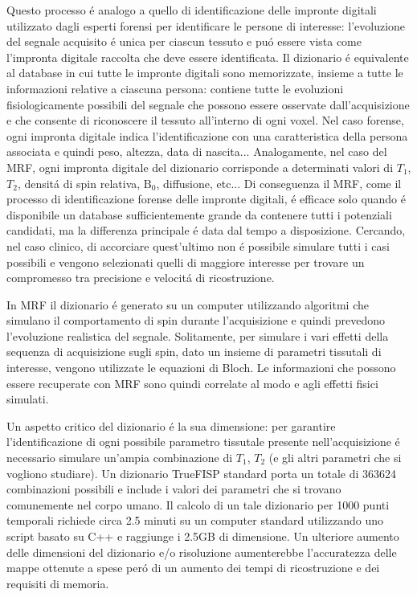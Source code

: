 \documentclass[a4paper,12pt]{report}
\begin{document}
 Questo processo \'e analogo a quello di identificazione delle impronte digitali utilizzato dagli esperti forensi per identificare le persone di interesse: l'evoluzione del segnale acquisito \'e unica per ciascun tessuto e pu\'o essere vista come l'impronta digitale raccolta che deve essere identificata. 
 Il dizionario \'e equivalente al database in cui tutte le impronte digitali sono memorizzate, insieme a tutte le informazioni relative a ciascuna persona: contiene tutte le evoluzioni fisiologicamente possibili del segnale che possono essere osservate dall'acquisizione e che consente di riconoscere il tessuto all'interno di ogni voxel. 
 Nel caso forense, ogni impronta digitale indica l'identificazione con una caratteristica della persona associata e quindi peso, altezza, data di nascita... 
 Analogamente, nel caso del MRF, ogni impronta digitale del dizionario corrisponde a determinati valori di $T_1$, $T_2$, densit\'a di spin relativa, $\mbox{B}_0$, diffusione, etc... 
 Di conseguenza il MRF, come il processo di identificazione forense delle impronte digitali, \'e efficace solo quando \'e disponibile un database sufficientemente grande da contenere tutti i potenziali candidati, ma la differenza principale \'e data dal tempo a disposizione. 
 Cercando, nel caso clinico, di accorciare quest'ultimo non \'e possibile simulare tutti i casi possibili e vengono selezionati quelli di maggiore interesse per trovare un compromesso tra precisione e velocit\'a di ricostruzione. 
 
 In MRF il dizionario \'e generato su un computer utilizzando algoritmi che simulano il comportamento di spin durante l'acquisizione e quindi prevedono l'evoluzione realistica del segnale. 
 Solitamente, per simulare i vari effetti della sequenza di acquisizione sugli spin, dato un insieme di parametri tissutali di interesse, vengono utilizzate le equazioni di Bloch. 
 Le informazioni che possono essere recuperate con MRF sono quindi correlate al modo e agli effetti fisici simulati. 
 
 Un aspetto critico del dizionario \'e la sua dimensione: per garantire l'identificazione di ogni possibile parametro tissutale presente nell'acquisizione \'e necessario simulare un'ampia combinazione di $T_1$, $T_2$ (e gli altri parametri che si vogliono studiare). 
 Un dizionario TrueFISP standard porta un totale di 363624 combinazioni possibili e include i valori dei parametri che si trovano comunemente nel corpo umano. 
 Il calcolo di un tale dizionario per 1000 punti temporali richiede circa 2.5 minuti su un computer standard utilizzando uno script basato su C++ e raggiunge i 2.5GB di dimensione. 
 Un ulteriore aumento delle dimensioni del dizionario e/o risoluzione aumenterebbe l'accuratezza delle mappe ottenute a spese per\'o di un aumento dei tempi di ricostruzione e dei requisiti di memoria. 
 
\end{document}
